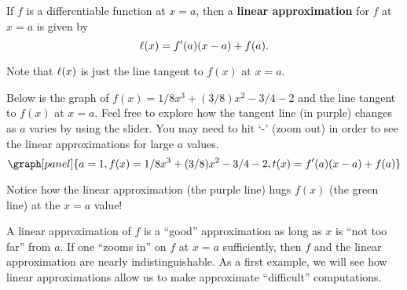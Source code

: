 \documentclass[handout,nooutcomes]{ximera}
\begin{document}
\begin{definition}
If $f$ is a differentiable function at $x=a$, then a \textbf{linear
  approximation} for $f$ at $x=a$ is given by
\[
\ell(x) = f'(a)(x-a) +f(a).
\]
\end{definition}


Note that $\ell(x)$ is just the line tangent to $f(x)$ at $x=a$.


\begin{example}
Below is the graph of $f(x) = 1/8x^3 + (3/8)x^2 -3/4 - 2$ and the line
tangent to $f(x)$ at $x=a$. Feel free to explore how the tangent line
(in purple) changes as $a$ varies by using the slider. You may need to
hit `-' (zoom out) in order to see the linear approximations for large $a$ values.
\[
\graph[panel]{a=1, f(x) = 1/8x^3 + (3/8)x^2 -3/4 - 2, t(x) = f'(a)(x-a)+ f(a)}
\]

Notice how the linear approximation (the purple line) hugs
$f(x)$ (the green line) at the $x=a$ value!
\end{example}

A linear approximation of $f$ is a ``good'' approximation as long as
$x$ is ``not too far'' from $a$.
If one ``zooms in'' on $f$ at $x=a$ sufficiently, then $f$ and the linear
approximation are nearly indistinguishable. As a first example, we
will see how linear approximations allow us to make approximate
``difficult'' computations.
\end{document}
